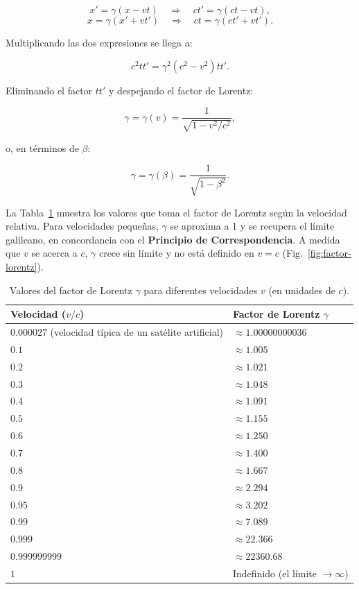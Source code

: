 $$x' = \gamma(x - vt) \quad \Rightarrow \quad ct' = \gamma(ct - vt),$$
$$x = \gamma(x' + vt') \quad \Rightarrow \quad ct = \gamma(ct' + vt').$$

Multiplicando las dos expresiones se llega a:

$$c^2 tt' = \gamma^2 (c^2 - v^2) tt'.$$

Eliminando el factor $tt'$ y despejando el factor de Lorentz:

$$\gamma = \gamma(v) = \frac{1}{\sqrt{1 - v^2/c^2}},$$

o, en términos de $\beta$:

$$\gamma = \gamma(\beta) = \frac{1}{\sqrt{1 - \beta^2}}.$$

La Tabla~\ref{tab:factor-lorentz} muestra los valores que toma el factor de Lorentz según la velocidad relativa. Para velocidades pequeñas, $\gamma$ se aproxima a 1 y se recupera el límite galileano, en concordancia con el \textbf{Principio de Correspondencia}. A medida que $v$ se acerca a $c$, $\gamma$ crece sin límite y no está definido en $v=c$ (Fig.~\ref{fig:factor-lorentz}).

\begin{table}[H]
\centering
\caption{Valores del factor de Lorentz $\gamma$ para diferentes velocidades $v$ (en unidades de $c$).}
\label{tab:factor-lorentz}
\begin{tabular}{ll}
\hline
Velocidad ($v/c$) & Factor de Lorentz $\gamma$ \\
\hline
$0.000027$ (velocidad típica de un satélite artificial) & $\approx 1.00000000036$ \\
$0.1$   & $\approx 1.005$ \\
$0.2$   & $\approx 1.021$ \\
$0.3$   & $\approx 1.048$ \\
$0.4$   & $\approx 1.091$ \\
$0.5$   & $\approx 1.155$ \\
$0.6$   & $\approx 1.250$ \\
$0.7$   & $\approx 1.400$ \\
$0.8$   & $\approx 1.667$ \\
$0.9$   & $\approx 2.294$ \\
$0.95$  & $\approx 3.202$ \\
$0.99$  & $\approx 7.089$ \\
$0.999$ & $\approx 22.366$ \\
$0.999999999$ & $\approx 22360.68$ \\
$1$ & Indefinido (el límite $\to \infty$) \\
\hline
\end{tabular}
\end{table}

